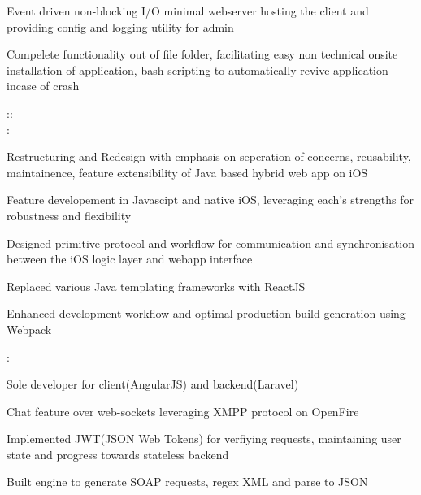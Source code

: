 \documentclass[]{hemant-style}
\begin{document}
\begin{minipage}[]{\textwidth}
\begin{minipage}{\textwidth}
\begin{minipage}[t][][c]{.75\textwidth}
\begin{hitemize}
                                \item Event driven non-blocking I/O minimal webserver hosting the client and  providing config and logging utility for admin
                                \item Compelete functionality out of file folder, facilitating easy non technical onsite installation of application, bash scripting to automatically revive  application incase of crash
                            \end{hitemize}
                            ::\\
                            :
                            \begin{hitemize}
                                \item Restructuring and Redesign with emphasis on seperation of concerns, reusability, maintainence, feature extensibility of Java based hybrid web app on iOS
                                \item Feature developement in Javascipt and native iOS, leveraging each’s strengths for robustness and flexibility
                                \item Designed primitive protocol and workflow for communication and synchronisation between the iOS logic layer and webapp interface
                                \item Replaced various Java templating frameworks with ReactJS
                                \item Enhanced development workflow and optimal production build generation using Webpack
                            \end{hitemize}
                            :
                            \begin{hitemize}
                                \item Sole developer for client(AngularJS) and backend(Laravel)
                                \item Chat feature over web-sockets leveraging XMPP protocol on OpenFire
                                \item Implemented JWT(JSON Web Tokens) for verfiying requests, maintaining user state and progress towards stateless backend
                                \item Built engine to generate SOAP requests, regex XML and parse to JSON 

\end{hitemize}
\end{minipage}
\end{minipage}
\end{minipage}
\end{document}

